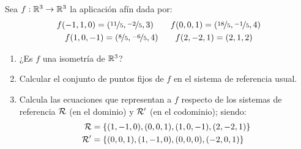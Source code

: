 \documentclass[12pt]{article}
\begin{document}
    \begin{ejercicio}
        Sea $f:\mathbb{R}^3\to \mathbb{R}^3$ la aplicación afín dada por:
        \begin{gather*}
            f(-1,1,0) = (\nicefrac{11}{5}, \nicefrac{-2}{5}, 3) \qquad
            f(0,0,1) = (\nicefrac{18}{5}, \nicefrac{-1}{5}, 4) \\
            f(1,0,-1) = (\nicefrac{8}{5}, \nicefrac{-6}{5}, 4) \qquad
            f(2,-2,1)=(2,1,2)
        \end{gather*}
        \begin{enumerate}
            \item ¿Es $f$ una isometría de $\mathbb{R}^3$?
            \item Calcular el conjunto de puntos fijos de $f$ en el sistema de referencia usual.
            \item Calcula las ecuaciones que representan a $f$ respecto de los sistemas de referencia $\mathcal{R}$ (en el dominio) y $\mathcal{R}'$ (en el codominio); siendo:
            \begin{equation*}
                \begin{split}
                    \mathcal{R}&= \{(1,-1,0), (0,0,1), (1,0,-1), (2,-2,1)\} \\
                    \mathcal{R}'&= \{(0,0,1), (1,-1,0), (0,0,0), (-2,0,1)\} \\
                \end{split}
            \end{equation*}
        \end{enumerate}
    \end{ejercicio}   
\end{document}
